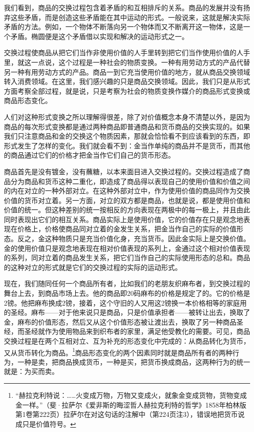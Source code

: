 \documentclass{ctexbook}
\begin{document}
        我们看到，商品的交换过程包含着矛盾的和互相排斥的关系。商品的发展并没有扬弃这些矛盾，而是创造这些矛盾能在其中运动的形式。一般说来，这就是解决实际矛盾的方法。例如，一个物体不断落向另一个物体而又不断离开这一物体，这是一个矛盾。椭圆便是这个矛盾借以实现和解决的运动形式之一。
        
        交换过程使商品从把它们当作非使用价值的人手里转到把它们当作使用价值的人手里，就这一点说，这个过程是一种社会的物质变换。一种有用劳动方式的产品代替另一种有用劳动方式的产品。商品一到它充当使用价值的地方，就从商品交换领域转入消费领域。在这里，我们感兴趣的只是商品交换领域。因此，我们只是从形式方面考察全部过程，就是说，只是考察为社会的物质变换作媒介的商品形式变换或商品形态变化。
        
        人们对这种形式变换之所以理解得很差，除了对价值概念本身不清楚以外，是因为商品的每次形式变换都是通过两种商品即普通商品和货币商品的交换实现的。如果我们只注意商品和金的交换这个物质因素，那就会恰恰看不到应该看到的东西，即形式发生了怎样的变化。我们就会看不到：金当作单纯的商品并不是货币，而其他的商品通过它们的价格才把金当作它们自己的货币形态。
        
        商品首先是没有镀金，没有蘸糖，以本来面目进入交换过程的。交换过程造成了商品分为商品和货币这种二重化，即造成了商品得以表现自己的使用价值和价值之间的内在对立的一种外部对立。在这种外部对立中，作为使用价值的商品同作为交换价值的货币对立着。另一方面，对立的双方都是商品，也就是说，都是使用价值和价值的统一。但这种差别的统一按相反的方向表现在两极中的每一极上，并且由此同时表现出它们的相互关系。商品实际上是使用价值，它的价值存在只是观念地表现在价格上，价格使商品同对立着的金发生关系，把金当作自己的实际的价值形态。反之，金这种物质只是充当价值化身，充当货币。因此金实际上是交换价值。金的使用价值只是观念地表现在相对价值表现的系列上，金通过这个相对价值表现的系列，同对立着的商品发生关系，把它们当作自己的实际使用形态的总和。商品的这种对立的形式就是它们的交换过程的实际的运动形式。
        
        现在，我们随同任何一个商品所有者，比如我们的老朋友织麻布者，到交换过程的舞台上去，到商品市场上去。他的商品即20码麻布的价格是规定了的。它的价格是2镑。他把麻布换成2镑，接着，这个守旧的人又用这2镑换一本价格相等的家庭用的圣经。麻布——对于他来说只是商品，只是价值承担者——被转让出去，换取了金，麻布的价值形态，然后又从这个价值形态被让渡出去，换取了另一种商品圣经，而圣经就作为使用物品来到织布者的家里，满足他受教化的需要。可见，商品交换过程是在两个互相对立、互为补充的形态变化中完成的：从商品转化为货币，又从货币转化为商品。\footnote{“赫拉克利特说：……火变成万物，万物又变成火，就象金变成货物，货物变成金一样。”（斐·拉萨尔《爱非斯的晦涩哲人赫拉克利特的哲学》1858年柏林版第1卷第222页）拉萨尔在对这句话的注解中（第224页注3），错误地把货币说成只是价值符号。}商品形态变化的两个因素同时就是商品所有者的两种行为，一种是卖，把商品换成货币，一种是买，把货币换成商品，这两种行为的统一就是：为买而卖。
        
\end{document}
